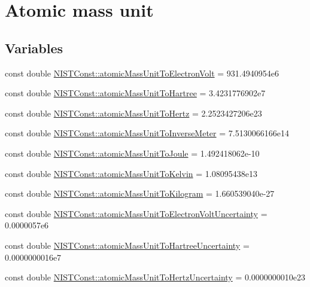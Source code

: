 \hypertarget{group___atomic_mass_unit}{}\section{Atomic mass unit}
\label{group___atomic_mass_unit}
\subsection*{Variables}
\begin{DoxyCompactItemize}
\item 
const double \hyperlink{group___atomic_mass_unit_ga4a5d912289e6a828a25e9e7ae3385b0d}{N\+I\+S\+T\+Const\+::atomic\+Mass\+Unit\+To\+Electron\+Volt} = 931.\+4940954e6
\item 
const double \hyperlink{group___atomic_mass_unit_ga8a6b352e1a13d0cbbc0f36f650e2c682}{N\+I\+S\+T\+Const\+::atomic\+Mass\+Unit\+To\+Hartree} = 3.\+4231776902e7
\item 
const double \hyperlink{group___atomic_mass_unit_gad284f1982f0182e1e4a90e0bff793af9}{N\+I\+S\+T\+Const\+::atomic\+Mass\+Unit\+To\+Hertz} = 2.\+2523427206e23
\item 
const double \hyperlink{group___atomic_mass_unit_gae1f5517810a5df9365d26887c04ada40}{N\+I\+S\+T\+Const\+::atomic\+Mass\+Unit\+To\+Inverse\+Meter} = 7.\+5130066166e14
\item 
const double \hyperlink{group___atomic_mass_unit_gaea7c1916a35df8824ac6a67be3f65f33}{N\+I\+S\+T\+Const\+::atomic\+Mass\+Unit\+To\+Joule} = 1.\+492418062e-\/10
\item 
const double \hyperlink{group___atomic_mass_unit_gaf9c3a2dfd69d4e74cee3361abd7d7ecf}{N\+I\+S\+T\+Const\+::atomic\+Mass\+Unit\+To\+Kelvin} = 1.\+08095438e13
\item 
const double \hyperlink{group___atomic_mass_unit_gafdd40d93803d15e1ff887dc12c49ca99}{N\+I\+S\+T\+Const\+::atomic\+Mass\+Unit\+To\+Kilogram} = 1.\+660539040e-\/27
\item 
const double \hyperlink{group___atomic_mass_unit_ga5b9ec7f36c14dabc54a16d1e076bee14}{N\+I\+S\+T\+Const\+::atomic\+Mass\+Unit\+To\+Electron\+Volt\+Uncertainty} = 0.\+0000057e6
\item 
const double \hyperlink{group___atomic_mass_unit_ga99d6950b6326e7131f95abe5c90fb8da}{N\+I\+S\+T\+Const\+::atomic\+Mass\+Unit\+To\+Hartree\+Uncertainty} = 0.\+0000000016e7
\item 
const double \hyperlink{group___atomic_mass_unit_gab009bca22e1cbed231798616f659b353}{N\+I\+S\+T\+Const\+::atomic\+Mass\+Unit\+To\+Hertz\+Uncertainty} = 0.\+0000000010e23

\end{DoxyCompactItemize}
